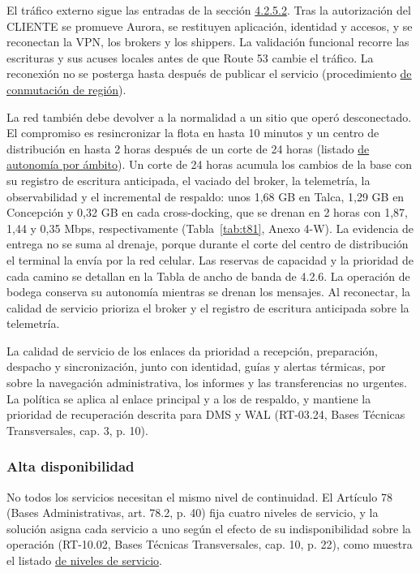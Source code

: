 El tráfico externo sigue las entradas de la sección \hyperref[sub:superficie]{4.2.5.2}. Tras la autorización del CLIENTE se promueve Aurora, se restituyen aplicación, identidad y accesos, y se reconectan la VPN, los brokers y los shippers. La validación funcional recorre las escrituras y sus acuses locales antes de que Route 53 cambie el tráfico. La reconexión no se posterga hasta después de publicar el servicio (procedimiento \hyperref[tab:4-3-6]{de conmutación de región}).

La red también debe devolver a la normalidad a un sitio que operó desconectado. El compromiso es resincronizar la flota en hasta 10 minutos y un centro de distribución en hasta 2 horas después de un corte de 24 horas (listado \hyperref[tab:t29]{de autonomía por ámbito}). Un corte de 24 horas acumula los cambios de la base con su registro de escritura anticipada, el vaciado del broker, la telemetría, la observabilidad y el incremental de respaldo: unos 1,68 GB en Talca, 1,29 GB en Concepción y 0,32 GB en cada cross-docking, que se drenan en 2 horas con 1,87, 1,44 y 0,35 Mbps, respectivamente (Tabla~\ref{tab:t81}, Anexo 4-W). La evidencia de entrega no se suma al drenaje, porque durante el corte del centro de distribución el terminal la envía por la red celular. Las reservas de capacidad y la prioridad de cada camino se detallan en la Tabla de ancho de banda de 4.2.6. La operación de bodega conserva su autonomía mientras se drenan los mensajes. Al reconectar, la calidad de servicio prioriza el broker y el registro de escritura anticipada sobre la telemetría.

La calidad de servicio de los enlaces da prioridad a recepción, preparación, despacho y sincronización, junto con identidad, guías y alertas térmicas, por sobre la navegación administrativa, los informes y las transferencias no urgentes. La política se aplica al enlace principal y a los de respaldo, y mantiene la prioridad de recuperación descrita para DMS y WAL (RT-03.24, Bases Técnicas Transversales, cap. 3, p. 10).

\subsubsection{Alta disponibilidad}
\label{sub:3-alta-disponibilidad}

No todos los servicios necesitan el mismo nivel de continuidad. El Artículo 78 (Bases Administrativas, art. 78.2, p. 40) fija cuatro niveles de servicio, y la solución asigna cada servicio a uno según el efecto de su indisponibilidad sobre la operación (RT-10.02, Bases Técnicas Transversales, cap. 10, p. 22), como muestra el listado \hyperref[tab:jd05]{de niveles de servicio}.


